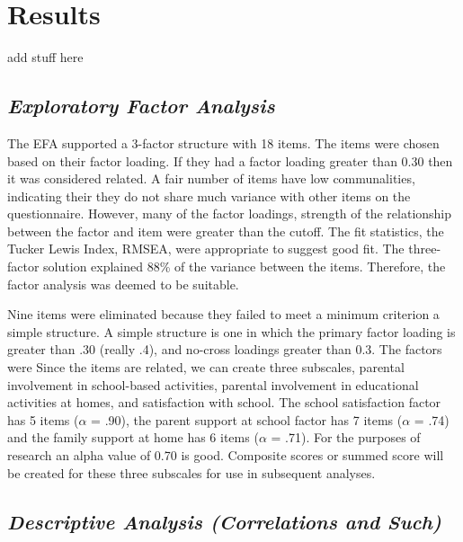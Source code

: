 \documentclass[
]{article}
\begin{document}
\hypertarget{results}{%
\section{\texorpdfstring{\textbf{Results}}{Results}}\label{results}}

add stuff here

\hypertarget{exploratory-factor-analysis}{%
\subsection{\texorpdfstring{\textbf{\emph{Exploratory Factor
Analysis}}}{Exploratory Factor Analysis}}\label{exploratory-factor-analysis}}

The EFA supported a 3-factor structure with 18 items. The items were
chosen based on their factor loading. If they had a factor loading
greater than 0.30 then it was considered related. A fair number of items
have low communalities, indicating their they do not share much variance
with other items on the questionnaire. However, many of the factor
loadings, strength of the relationship between the factor and item were
greater than the cutoff. The fit statistics, the Tucker Lewis Index,
RMSEA, were appropriate to suggest good fit. The three-factor solution
explained 88\% of the variance between the items. Therefore, the factor
analysis was deemed to be suitable.

Nine items were eliminated because they failed to meet a minimum
criterion a simple structure. A simple structure is one in which the
primary factor loading is greater than .30 (really .4), and no-cross
loadings greater than 0.3. The factors were Since the items are related,
we can create three subscales, parental involvement in school-based
activities, parental involvement in educational activities at homes, and
satisfaction with school. The school satisfaction factor has 5 items
(\(\alpha\) = .90), the parent support at school factor has 7 items
(\(\alpha\) = .74) and the family support at home has 6 items
(\(\alpha\) = .71). For the purposes of research an alpha value of 0.70
is good. Composite scores or summed score will be created for these
three subscales for use in subsequent analyses.

\hypertarget{descriptive-analysis-correlations-and-such}{%
\subsection{\texorpdfstring{\textbf{\emph{Descriptive Analysis
(Correlations and
Such)}}}{Descriptive Analysis (Correlations and Such)}}\label{descriptive-analysis-correlations-and-such}}
\end{document}
